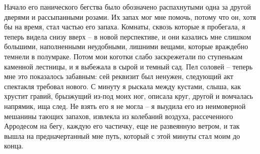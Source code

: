 Начало его панического  бегства было обозначено распахнутыми  одна за другой
дверями и рассыпанными розами. Их запах  мог мне помочь, потому что он, хотя
бы на время, стал частью его  запаха. Комнаты, сквозь которые я пробегала, я
теперь видела снизу вверх -- в новой перспективе, и они казались мне слишком
большими, наполненными неудобными, лишними вещами, которые враждебно темнели
в полумраке.  Потом мои  коготки слабо  заскрежетали по  ступенькам каменной
лестницы,  и  я  выбежала в  сырой  и  темный  сад.  Пел соловей  --  теперь
мне  это  показалось  забавным:  сей реквизит  был  ненужен,  следующий  акт
спектакля  требовал  нового.  С  минуту  я  рыскала  между  кустами,  слыша,
как  хрустит гравий,  брызжущий  из-под  моих ног,  описала  круг, другой  и
вомчалась напрямик,  ища след.  Не взять  его я  не могла  -- я  выудила его
из  неимоверной  мешанины тающих  запахов,  извлекла  из колебаний  воздуха,
рассеченного  Арродесом на  бегу,  каждую его  частичку,  еще не  развеянную
ветром, и так вышла на предначертанный  мне путь, который с этой минуты стал
моим до конца.

